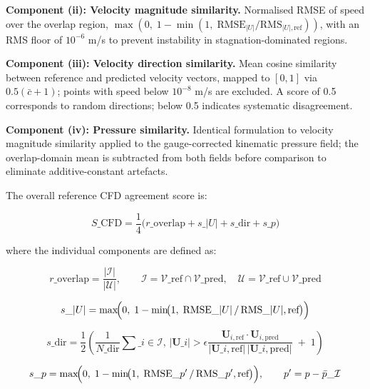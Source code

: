 \documentclass[preprint,12pt,number]{elsarticle}
\begin{document}
\textbf{Component (ii): Velocity magnitude similarity.} Normalised RMSE of speed over the overlap region, $\max(0,\; 1 - \min(1,\; \text{RMSE}_{|U|} / \text{RMS}_{|U|,\text{ref}}))$, with an RMS floor of $10^{-6}$ m/s to prevent instability in stagnation-dominated regions.

\textbf{Component (iii): Velocity direction similarity.} Mean cosine similarity between reference and predicted velocity vectors, mapped to $[0,1]$ via $0.5(\bar{c}+1)$; points with speed below $10^{-8}$ m/s are excluded. A score of 0.5 corresponds to random directions; below 0.5 indicates systematic disagreement.

\textbf{Component (iv): Pressure similarity.} Identical formulation to velocity magnitude similarity applied to the gauge-corrected kinematic pressure field; the overlap-domain mean is subtracted from both fields before comparison to eliminate additive-constant artefacts.

The overall reference CFD agreement score is:

\begin{equation}
S\_\text{CFD} = \frac{1}{4}\bigl(r\_\text{overlap} + s\_{|U|} + s\_\text{dir} + s\_p\bigr)
\label{eq:cfd-agreement-score}
\end{equation}

where the individual components are defined as:

\begin{equation}
r\_\text{overlap} = \frac{|\mathcal{I}|}{|\mathcal{U}|}, \qquad \mathcal{I} = \mathcal{V}\_\text{ref} \cap \mathcal{V}\_\text{pred}, \quad \mathcal{U} = \mathcal{V}\_\text{ref} \cup \mathcal{V}\_\text{pred}
\label{eq:overlap-ratio}
\end{equation}

\begin{equation}
s\_{|U|} = \max\!\Bigl(0,\; 1 - \min\!\bigl(1,\; \text{RMSE}\_{|U|}\, /\, \text{RMS}\_{|U|,\text{ref}}\bigr)\Bigr)
\label{eq:vel-mag-sim}
\end{equation}

\begin{equation}
s\_\text{dir} = \frac{1}{2}\!\left(\frac{1}{N\_\text{dir}} \sum\_{i \in \mathcal{I},\, |\mathbf{U}\_i| > \epsilon} \frac{\mathbf{U}_{i,\text{ref}} \cdot \mathbf{U}_{i,\text{pred}}}{|\mathbf{U}\_{i,\text{ref}}|\,|\mathbf{U}\_{i,\text{pred}}|} \;+\; 1\right)
\label{eq:vel-dir-sim}
\end{equation}

\begin{equation}
s\_p = \max\!\Bigl(0,\; 1 - \min\!\bigl(1,\; \text{RMSE}\_{p'}\, /\, \text{RMS}\_{p',\text{ref}}\bigr)\Bigr), \qquad p' = p - \bar{p}\_{\mathcal{I}}
\label{eq:pressure-sim}
\end{equation}
\end{document}
